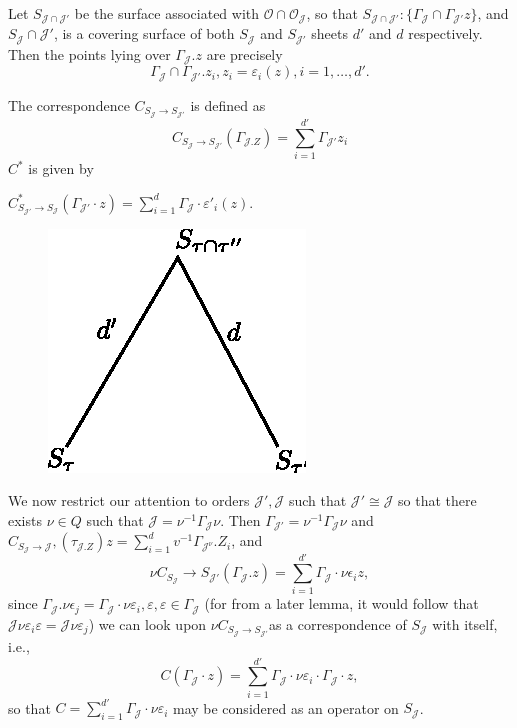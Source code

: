   Let $S_{\mathcal{J} \cap \mathcal{J'} }$ be the surface associated
  with $\mathscr{O} \cap \mathscr{O}_{\mathcal{J}}$, so that $S_{
    \mathcal{J} \cap \mathcal{J'}} : \{ \Gamma_{\mathcal{J}}\cap
  \Gamma _{\mathcal{J}'}z\}$, and $S_{\mathcal{J}}\cap \mathcal{J'}$,
  is a covering surface of both $S_{\mathcal{J}}$ and
  $S_{\mathcal{J}'}$ sheets $d'$ and $d$ respectively. Then the points
  lying over $\Gamma_{\mathcal{J}}.  z$ are precisely  
  $$
  \Gamma_{\mathcal{J}} \cap \Gamma_{\mathcal{J'}}. z_i,  z_i =
  \varepsilon _i (z), i = 1,  \ldots,  d'. 
  $$
  

  The correspondence $C_{S_{\mathcal{J}} \to S_{\mathcal{J}'}}$ is defined as 
  $$
  C_{S_{\mathcal{J}} \to S_{\mathcal{J}'}} (\Gamma_{\mathcal{J}.  Z})
  = \sum^{d'}_{ i = 1}\Gamma_{\mathcal{J}'} z_i 
  $$
  $C^* $ is given by 

  \hfill $C^\ast_{S_{\mathcal{J}'} \to S_{\mathcal{J}}}
  (\Gamma_{\mathcal{J}'}\cdot  z) = \sum^d_{i =
    1}\Gamma_{\mathcal{J}}\cdot \varepsilon'_i (z)$. 
  \begin{figure}[H]
    \centerline{\includegraphics{vol9-figures/fig9-11.eps}}
  \end{figure}
\medskip

  We now restrict our attention to orders $\mathcal{J'}, \mathcal{J}$
  such that $\mathcal{J'}  \cong \mathcal{J}$ so that there exists
  $\nu \in Q$ such that $\mathcal{J} = \nu ^{-1} \Gamma_{\mathcal{J}}
  \nu $. Then $\Gamma_{\mathcal{J}'} = \nu^{-1} \Gamma_{\mathcal{J}}
  \nu$ and $C_{S_{\mathcal{J}}\to \mathcal{J}}, (\tau _{ \mathcal{J}.
  Z}) z = \sum^d_{ i = 1} v^{-1}\Gamma_{\mathcal{J}^ \nu}.Z_i $,  
  and 
  $$
  \nu C_{S_{\mathcal{J}}}\to S_{\mathcal{J}'} (\Gamma_{\mathcal{J}}.z)
  =\sum^{d'}_{ i = 1} \Gamma_{\mathcal{J}}\cdot \nu \epsilon_i z,  
  $$
  since $\Gamma _{\mathcal{J}}. \nu \epsilon_j =
  \Gamma_{\mathcal{J}}\cdot \nu \varepsilon _i,
  \varepsilon,  \varepsilon  \in \Gamma_{ \mathcal{J}}$ (for from a
  later lemma, it would follow that $\mathcal{J} \nu \varepsilon _i
  \varepsilon = \mathcal{J} \nu \varepsilon_j$) we can look upon $\nu
  C_{S_\mathcal{J} \to S_{\mathcal{J}'}}$\pageoriginale as a correspondence of
  $S_\mathcal{J}$ with itself, i.e.,
  $$
  C(\Gamma_{\mathcal{J}} \cdot z) = \sum\limits^{d'}_{i=1}
  \Gamma_{\mathcal{J}} \cdot \nu \varepsilon_i \cdot
  \Gamma_{\mathcal{J}} \cdot z,
  $$
  so that $C= \sum\limits_{i=1}^{d'} \Gamma_{\mathcal{J}}\cdot
 \nu \varepsilon _i$ may be
  considered as an operator on $S_{\mathcal{J}}$.  

